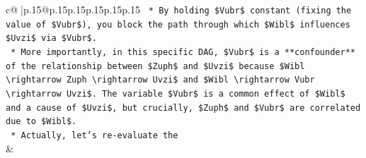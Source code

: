 \documentclass{article}
\begin{document}
{\begin{supertabular}{c@{$\;$}|p{.15\linewidth}@{}p{.15\linewidth}p{.15\linewidth}p{.15\linewidth}p{.15\linewidth}p{.15\linewidth}}
{{{\texttt{    *   By holding \$Vubr\$ constant (fixing the value of \$Vubr\$), you block the path through which \$Wibl\$ influences \$Uvzi\$ via \$Vubr\$.} \\
\texttt{    *   More importantly, in this specific DAG, \$Vubr\$ is a **confounder** of the relationship between \$Zuph\$ and \$Uvzi\$ because \$Wibl \textbackslash{}rightarrow Zuph \textbackslash{}rightarrow Uvzi\$ and \$Wibl \textbackslash{}rightarrow Vubr \textbackslash{}rightarrow Uvzi\$. The variable \$Vubr\$ is a common effect of \$Wibl\$ and a cause of \$Uvzi\$, but crucially, \$Zuph\$ and \$Vubr\$ are correlated due to \$Wibl\$.} \\
\texttt{    *   Actually, let's re{-}evaluate the} \\
            }
        }
    }
    & \\ \\


\end{supertabular}}
\end{document}
